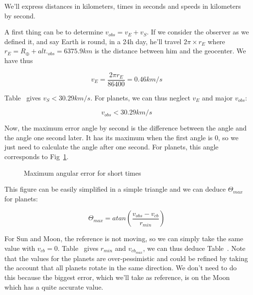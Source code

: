 We'll express distances in kilometers, times in seconds and speeds in kilometers by second.

A first thing can be to determine $v_{obs}=v_E+v_S$. If we consider the observer as we defined it, and say Earth is round, in a 24h day, he'll travel $2\pi\times r_{E}$ where $r_{E}=R_\oplus+alt._{obs}=6375.9km$ is the distance between him and the geocenter. We have thus 

\begin{equation}
v_E = \frac{2\pi r_E}{86400} = 0.46km/s
\end{equation}

Table~\cite{table:planetvalues} gives $v_S < 30.29 km/s$. For planets, we can thus neglect $v_E$ and major $v_{obs}$:

\begin{equation}
v_{obs} < 30.29 km/s
\end{equation}

Now, the maximum error angle by second is the difference between the angle and the angle one second later. It has its maximum when the first angle is 0, so we just need to calculate the angle after one second. For planets, this angle corresponds to Fig~\ref{maxangularerror}.

\begin{figure}
\centering 
{}
\caption{Maximum angular error for short times}\label{maxangularerror}
\end{figure}

This figure can be easily simplified in a simple triangle and we can deduce $\Theta_{max}$ for planets:

\begin{equation}
\Theta_{max}=atan(\frac{v_{obs}-v_{cb}}{r_{min}})
\end{equation}

For Sun and Moon, the reference is not moving, so we can simply take the same value with $v_{cb}=0$. Table~\cite{table:planetvalues} gives $r_{min}$ and $v_{cb_{max}}$, we can thus deduce Table~\cite{table:thetamaxtime}. Note that the values for the planets are over-pessimistic and could be refined by taking the account that all planets rotate in the same direction. We don't need to do this because the biggest error, which we'll take as reference, is on the Moon which has a quite accurate value.

